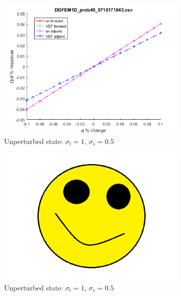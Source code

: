 \documentclass[12pt]{report}
\newcommand{\sigt}{\sigma_t}
\newcommand{\sigs}{\sigma_s}
\begin{document}
\begin{figure}[H]
\begin{subfigure}{.5\textwidth}
  \includegraphics[width=.98\linewidth]{figures/40qSens.png}
  \caption{Unperturbed state: $\sigt=1$, $\sigs=0.5$}
  \label{fig:sfig2}
\end{subfigure}%
\begin{subfigure}{.5\textwidth}
  \centering
  \includegraphics[width=.98\linewidth]{figures/holder.png}
  \caption{Unperturbed state: $\sigt=1$, $\sigs=0.5$}
  \label{fig:sfig5}
\end{subfigure}%
\\
\begin{subfigure}{.5\textwidth}
  \centering

\end{subfigure}
\end{figure}
\end{document}

